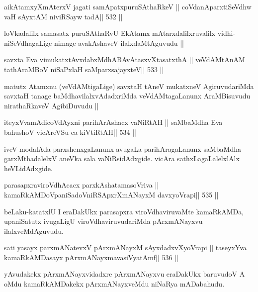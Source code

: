 \begin{shl}
aikAtamxyXmAterxV jagati samApatxpuruSAthaRkeV ||
coVdanAparxtiSeVdhw vaH sAyxtAM niviRSayw tadA\hfill || 532 ||
\end{shl}

\begin{artha}
loVkadalilx samasatx puruSAthaRvU EkAtamx mAtarxdalilxruvalilx
vidhi-niSeVdhagaLige nimage avakAshaveV ilalxdaMtAguvudu ||
\end{artha}

\begin{shl}
savxta Eva vimukatxtAvxdabxMdhABAvAtasxvXtasatxthA ||
veVdAMtAnAM tathA\s\s raMBoV niSaPxlaH saMparxsajayxteV\hfill || 533 ||
\end{shl}

\begin{artha}
matutx Atamxnu (veVdAMtigaLige) savxtaH tAneV mukatxneV
AgiruvudariMda savxtaH tanage baMdhavilalxvAdadxriMda veVdAMtagaLanunx
AraMBisuvudu nirathaRkaveV AgibiDuvudu ||
\end{artha}

\begin{shl}
iteyxVvamAdicoVdAyxni parihArAshacx vaNiRtAH ||
saMbaMdha Eva bahushoV vicAreVSu ca kiVtiRtAH\hfill || 534 ||
\end{shl}

\begin{artha}
iveV modalAda parxshenxgaLanunx avugaLa parihAragaLanunx saMbaMdha
garxMthadalelxV aneVka sala vaNiRsidAdxgide. vicAra sathxLagaLalelxlAlx 
heVLidAdxgide.
\end{artha}

\begin{shl}
parasapxraviroVdhAcacx parxkAshatamasoVriva ||
kamaRkAMDoVpaniSadoVniRSApxrXmANayxM davxyoVrapi\hfill || 535 ||
\end{shl}

\begin{artha}
beLaku-katatxlU I eraDakUkx parasapxra viroVdhaviruvaMte
kamaRkAMDa, upaniSatutx ivugaLigU viroVdhaviruvudariMda pArxmANayxvu ilalxveMdAguvudu.
\end{artha}

\begin{shl}
sati yasayx parxmANatevxV pArxmANayxM sAyxdadxvXyoVrapi ||
taseyxYva kamaRkAMDasayx pArxmANayxmavasiVyatAmf\hfill || 536 ||
\end{shl}

\begin{artha}
yAvudakekx pArxmANayxvidadxre pArxmANayxvu eraDakUkx baruvudoV A oMdu
kamaRkAMDakekx pArxmANayxveMdu niNaRya mADabahudu.
\end{artha}

